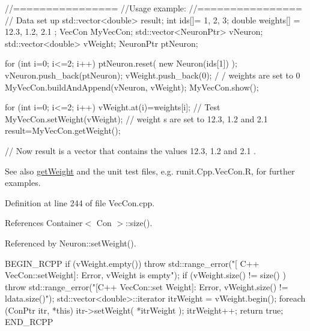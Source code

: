 \begin{DoxyCode}
        //================
        //Usage example:
        //================
        // Data set up
                std::vector<double> result;
                        int ids[]= {1, 2, 3};
                        double weights[] = {12.3, 1.2, 2.1 };
                        VecCon MyVecCon;
                        std::vector<NeuronPtr> vNeuron;
                        std::vector<double> vWeight;
                        NeuronPtr ptNeuron;

                        for (int i=0; i<=2; i++) {
                        ptNeuron.reset( new Neuron(ids[1]) );
                        vNeuron.push_back(ptNeuron);
                        vWeight.push_back(0);                                   /
      / weights are set to 0
                        }
                        MyVecCon.buildAndAppend(vNeuron, vWeight);
                        MyVecCon.show();

                        for (int i=0; i<=2; i++) {
                                vWeight.at(i)=weights[i];
                        }
        // Test
                        MyVecCon.setWeight(vWeight);                    // weight
      s are set to 12.3, 1.2 and 2.1
                        result=MyVecCon.getWeight();

        // Now result is a vector that contains the values 12.3, 1.2 and 2.1 .
\end{DoxyCode}


\begin{DoxySeeAlso}{See also}
\hyperlink{class_vec_con_aafa37c30d566b8784ac84d23a14b5638}{getWeight} and the unit test files, e.g. runit.Cpp.VecCon.R, for further examples. 
\end{DoxySeeAlso}


Definition at line 244 of file VecCon.cpp.



References Container$<$ Con $>$::size().



Referenced by Neuron::setWeight().


\begin{DoxyCode}
                                                  {
        BEGIN_RCPP
        if (vWeight.empty()) { throw std::range_error("[ C++ VecCon::setWeight]: 
      Error, vWeight is empty"); }
        if (vWeight.size() != size() ) { throw std::range_error("[C++ VecCon::set
      Weight]: Error, vWeight.size() != ldata.size()"); }
        std::vector<double>::iterator itrWeight = vWeight.begin();
        foreach (ConPtr itr, *this){
                itr->setWeight( *itrWeight );
                itrWeight++;
        }
        return true;
        END_RCPP
}
\end{DoxyCode}


